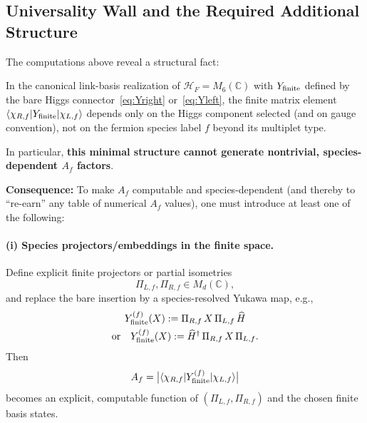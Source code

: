\subsection{Universality Wall and the Required Additional Structure}
\label{sec:universality_wall}

The computations above reveal a structural fact:

\begin{proposition}
\label{prop:universality}
In the canonical link-basis realization of $\mathcal{H}_F = M_6(\mathbb{C})$ with $Y_{\rm finite}$ 
defined by the bare Higgs connector~\eqref{eq:Yright} or~\eqref{eq:Yleft}, the finite matrix element
$\langle \chi_{R,f} | Y_{\rm finite} | \chi_{L,f} \rangle$ depends only on the Higgs component 
selected (and on gauge convention), not on the fermion species label $f$ beyond its multiplet type.

In particular, \textbf{this minimal structure cannot generate nontrivial, species-dependent $A_f$ factors}.
\end{proposition}

\noindent
\textbf{Consequence:} To make $A_f$ computable and species-dependent (and thereby to ``re-earn'' 
any table of numerical $A_f$ values), one must introduce at least one of the following:

\paragraph{(i) Species projectors/embeddings in the finite space.}
Define explicit finite projectors or partial isometries
\begin{equation}
\Pi_{L,f}, \Pi_{R,f} \in M_d(\mathbb{C}),
\end{equation}
and replace the bare insertion by a species-resolved Yukawa map, e.g.,
\begin{equation}
\begin{gathered}
Y^{(f)}_{\rm finite}(X) := \Pi_{R,f}\,X\,\Pi_{L,f}\,\widehat{H} \\
\text{or} \quad Y^{(f)}_{\rm finite}(X) := \widehat{H}^\dagger\,\Pi_{R,f}\,X\,\Pi_{L,f}.
\end{gathered}
\label{eq:Y_species}
\end{equation}
Then
\begin{equation}
A_f = \big|\langle \chi_{R,f} | Y^{(f)}_{\rm finite} | \chi_{L,f} \rangle\big|
\end{equation}
becomes an explicit, computable function of $(\Pi_{L,f}, \Pi_{R,f})$ and the chosen finite basis states.

